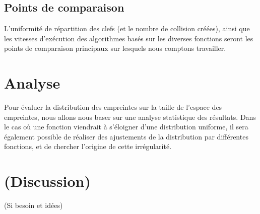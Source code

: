 \documentclass[final,twoside,twocolumn,10pt]{scrartcl}
\begin{document}
	\subsection{Points de comparaison}
		L'uniformité de répartition des clefs (et le nombre de collision créées), ainsi que les vitesses d'exécution des algorithmes basés sur les diverses fonctions seront les points de comparaison principaux sur lesquels nous comptons travailler.

\section{Analyse}
	Pour évaluer la distribution des empreintes sur la taille de l'espace des empreintes, nous allons nous baser sur une analyse statistique des résultats. Dans le cas où une fonction viendrait à s'éloigner d'une distribution uniforme, il sera également possible de réaliser des ajustements de la distribution par différentes fonctions, et de chercher l'origine de cette irrégularité.

\section{(Discussion)}
	(Si besoin et idées)

%
\end{document}
